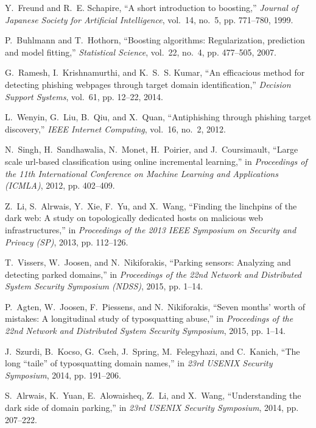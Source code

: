 \documentclass[10pt,conference,compsocconf,letterpaper]{IEEEtran}
\begin{document}
\begin{thebibliography}{10}
Y.~Freund and R.~E. Schapire, ``A short introduction to boosting,''
  \emph{Journal of Japanese Society for Artificial Intelligence}, vol.~14,
  no.~5, pp. 771--780, 1999.

P.~Buhlmann and T.~Hothorn, ``Boosting algorithms: Regularization, prediction
  and model fitting,'' \emph{Statistical Science}, vol.~22, no.~4, pp.
  477--505, 2007.

G.~Ramesh, I.~Krishnamurthi, and K.~S.~S. Kumar, ``An efficacious method for
  detecting phishing webpages through target domain identification,''
  \emph{Decision Support Systems}, vol.~61, pp. 12--22, 2014.

L.~Wenyin, G.~Liu, B.~Qiu, and X.~Quan, ``Antiphishing through phishing target
  discovery,'' \emph{IEEE Internet Computing}, vol.~16, no.~2, 2012.

N.~Singh, H.~Sandhawalia, N.~Monet, H.~Poirier, and J.~Coursimault, ``Large
  scale url-based classification using online incremental learning,'' in
  \emph{Proceedings of the 11th International Conference on Machine Learning
  and Applications (ICMLA)}, 2012, pp. 402--409.

Z.~Li, S.~Alrwais, Y.~Xie, F.~Yu, and X.~Wang, ``Finding the linchpins of the
  dark web: A study on topologically dedicated hosts on malicious web
  infrastructures,'' in \emph{Proceedings of the 2013 IEEE Symposium on
  Security and Privacy (SP)}, 2013, pp. 112--126.

T.~Vissers, W.~Joosen, and N.~Nikiforakis, ``Parking sensors: Analyzing and
  detecting parked domains,'' in \emph{Proceedings of the 22nd Network and
  Distributed System Security Symposium (NDSS)}, 2015, pp. 1--14.

P.~Agten, W.~Joosen, F.~Piessens, and N.~Nikiforakis, ``Seven months' worth of
  mistakes: A longitudinal study of typosquatting abuse,'' in \emph{Proceedings
  of the 22nd Network and Distributed System Security Symposium}, 2015, pp.
  1--14.

J.~Szurdi, B.~Kocso, G.~Cseh, J.~Spring, M.~Felegyhazi, and C.~Kanich, ``The
  long {\textquotedblleft}taile{\textquotedblright} of typosquatting domain
  names,'' in \emph{23rd USENIX Security Symposium}, 2014, pp. 191--206.

S.~Alrwais, K.~Yuan, E.~Alowaisheq, Z.~Li, and X.~Wang, ``Understanding the
  dark side of domain parking,'' in \emph{23rd USENIX Security Symposium},
  2014, pp. 207--222.


\end{thebibliography}
\end{document}
